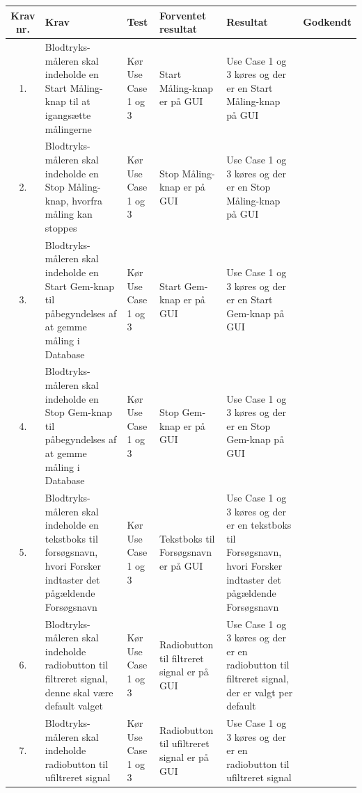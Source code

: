 \begin{longtabu} to 
	Krav nr. & Krav & Test & Forventet resultat & Resultat & Godkendt
	\\[-1ex] \midrule
	
	1. & Blodtryks-måleren skal indeholde en Start Måling-knap til at igangsætte målingerne & Kør Use Case 1 og 3 & Start Måling-knap er på GUI & Use Case 1 og 3 køres og der er en Start Måling-knap på GUI & {\Huge \checkmark}
	\\ 
	\midrule
	
	2. & Blodtryks-måleren skal indeholde en Stop Måling-knap, hvorfra måling kan stoppes & Kør Use Case 1 og 3 & Stop Måling-knap er på GUI & Use Case 1 og 3 køres og der er en Stop Måling-knap på GUI & {\Huge \checkmark}
	\\ 
	\midrule
	
	3. & Blodtryks-måleren skal indeholde en Start Gem-knap til påbegyndelses af at gemme måling i Database & Kør Use Case 1 og 3 & Start Gem-knap er på GUI & Use Case 1 og 3 køres og der er en Start Gem-knap på GUI & {\Huge \checkmark}
	\\ 
	\midrule
	
	4. & Blodtryks-måleren skal indeholde en Stop Gem-knap til påbegyndelses af at gemme måling i Database & Kør Use Case 1 og 3 & Stop Gem-knap er på GUI & Use Case 1 og 3 køres og der er en Stop Gem-knap på GUI & {\Huge \checkmark}
	\\ 
	\midrule
	
	5. & Blodtryks-måleren skal indeholde en tekstboks til forsøgsnavn, hvori Forsker indtaster det pågældende Forsøgsnavn & Kør Use Case 1 og 3 & Tekstboks til Forsøgsnavn er på GUI & Use Case 1 og 3 køres og der er en tekstboks til Forsøgsnavn, hvori Forsker indtaster det pågældende Forsøgsnavn  & {\Huge \checkmark}
	\\ 
	\midrule
	
	
	6. & Blodtryks-måleren skal indeholde radiobutton til filtreret signal, denne skal være default valget & Kør Use Case 1 og 3 & Radiobutton til filtreret signal er på GUI & Use Case 1 og 3 køres og der er en radiobutton til filtreret signal, der er valgt per default  &  {\Huge \checkmark}
	\\ 
	\midrule
	
	
	
	7. & Blodtryks-måleren skal indeholde radiobutton til ufiltreret signal & Kør Use Case 1 og 3 & Radiobutton til ufiltreret signal er på GUI & Use Case 1 og 3 køres og der er en radiobutton til ufiltreret signal &  {\Huge \checkmark}
	\\ 
	\midrule
	

\end{longtabu}
